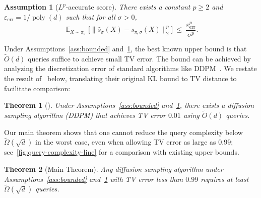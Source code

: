 \documentclass[11pt,letterpaper]{article}
\newtheorem{theorem}{Theorem}[section]
\newtheorem{assumption}{Assumption}
\DeclareMathOperator*{\E}{\mathbb{E}}
\DeclareMathOperator*{\poly}{poly}
\newcommand{\1}{\mathbbm{1}}
\newcommand{\err}{\mathrm{err}}
\begin{document}
\begin{assumption}[$L^p$-accurate score]
  \label{ass:Lp}
    There exists a constant $p \ge 2$ and $\varepsilon_\err = 1 / \poly(d)$ such that for all $\sigma > 0$,
  \[
    \E_{X\sim \pi_\sigma}\big[\|\widehat s_\sigma(X)-s_{\pi,\sigma}(X)\|_2^p\big]\ \le\ \frac{\varepsilon_\err^p}{\sigma^p}.
  \]
\end{assumption}



Under Assumptions~\ref{ass:bounded} and~\ref{ass:Lp}, the best known upper bound is that $\widetilde O(d)$ queries suffice to achieve small TV error. The bound can be achieved by analyzing the discretization error of standard algorithms like DDPM~\citep{benton2023linearconvergence,li2024odt,conforti2023score}. We restate the result of~\cite{benton2023linearconvergence} below, translating their original KL bound to TV distance to facilitate comparison:




\begin{theorem}[\cite{benton2023linearconvergence}]
    Under Assumptions~\ref{ass:bounded} and~\ref{ass:Lp}, there exists a diffusion sampling algorithm (DDPM) that achieves TV error $0.01$ using $\widetilde O(d)$ queries.
\end{theorem}

Our main theorem shows that one cannot reduce the query complexity below  $\widetilde \Omega(\sqrt{d})$ in the worst case, even when allowing TV error as large as 0.99; see~\cref{fig:query-complexity-line} for a comparison with existing upper bounds.




\begin{theorem}[Main Theorem]
  \label{thm:main_simplified}
   Any diffusion sampling algorithm under Assumptions~\ref{ass:bounded} and~\ref{ass:Lp} with TV error less than $0.99$ requires at least $\widetilde\Omega(\sqrt{d})$ queries.
\end{theorem}
\end{document}
